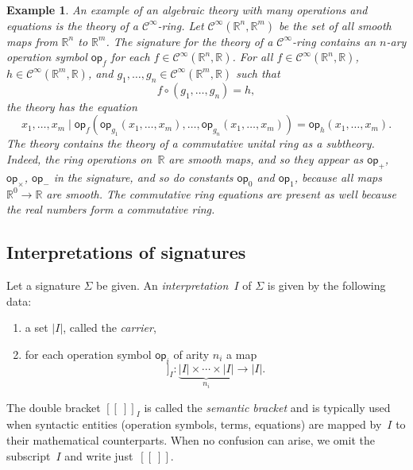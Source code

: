 \documentclass{amsart}
\newcommand{\RR}{\mathbb{R}}
\newcommand{\op}{\mathsf{op}}
\newcommand{\Cinfty}{\mathcal{C}^\infty}
\newcommand{\sem}[1]{[\![#1]\!]}
\newtheorem{example}[definition]{Example}
\begin{document}
\begin{example}
  \label{ex:Cinfty-theory}
  An example of an algebraic theory with many operations and equations is the theory of a
  $\Cinfty$-ring. Let $\Cinfty(\RR^n, \RR^m)$ be the set of all smooth maps from $\RR^n$
  to $\RR^m$. The signature for the theory of a $\Cinfty$-ring contains an $n$-ary
  operation symbol $\op_f$ for each $f \in \Cinfty(\RR^n, \RR)$. For all
  $f \in \Cinfty(\RR^n, \RR)$, $h \in \Cinfty(\RR^m, \RR)$, and
  $g_1, \ldots, g_n \in \Cinfty(\RR^m, \RR)$ such that
  \begin{equation*}
    f \circ (g_1, \ldots, g_n) = h,
  \end{equation*}
  the theory has the equation
  \begin{equation*}
    x_1, \ldots, x_m \mid
    \op_f (\op_{g_1}(x_1, \ldots, x_m), \ldots, \op_{g_n}(x_1, \ldots, x_m)) =
    \op_h(x_1, \ldots, x_m).
  \end{equation*}
  The theory contains the theory of a commutative unital ring as a subtheory. Indeed,
  the ring operations on~$\RR$ are smooth maps, and so they appear as $\op_{+}$,
  $\op_{\times}$, $\op_{-}$ in the signature, and so do constants $\op_0$ and $\op_1$,
  because all maps $\RR^0 \to \RR$ are smooth. The commutative ring equations are present
  as well because the real numbers form a commutative ring.
\end{example}


\subsection{Interpretations of signatures}
\label{sec:interp-of-sign}

Let a signature $\Sigma$ be given. An \emph{interpretation~$I$} of $\Sigma$ is given by
the following data:
%
\begin{enumerate}
\item a set $|I|$, called the \emph{carrier},
\item for each operation symbol $\op_i$ of arity $n_i$ a map
  \begin{equation*}
    \sem{\op_i}_I : \underbrace{|I| \times \cdots \times |I|}_{n_i} \to |I|.
  \end{equation*}
\end{enumerate}
%
The double bracket $\sem{{\ }}_I$ is called the \emph{semantic bracket} and is typically
used when syntactic entities (operation symbols, terms, equations) are mapped by~$I$ to
their mathematical counterparts. When no confusion can arise, we omit the subscript~$I$
and write just~$\sem{{\ }}$.
\end{document}
